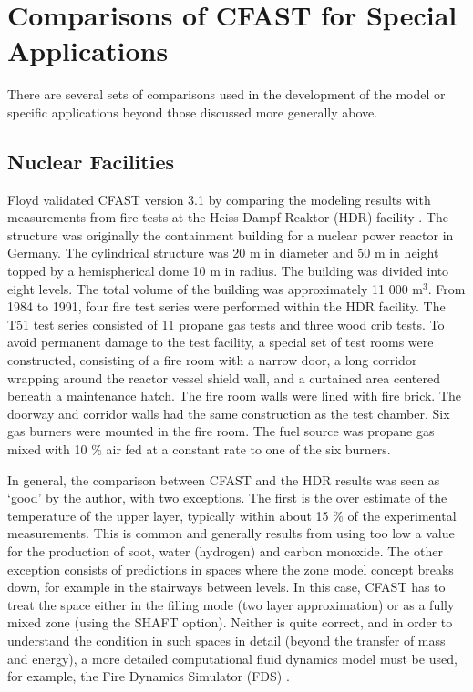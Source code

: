 \section{Comparisons of CFAST for Special Applications}

There are several sets of comparisons used in the development of the model or specific applications beyond those discussed more generally above.

\subsection{Nuclear Facilities}

Floyd validated CFAST version 3.1 by comparing the modeling results with measurements from fire tests at the Heiss-Dampf Reaktor (HDR) facility \cite{Floyd:2002}. The structure was originally the containment building for a nuclear power reactor in Germany. The cylindrical structure was 20 m in diameter and 50 m in height topped by a hemispherical dome 10 m in radius. The building was divided into eight levels. The total volume of the building was approximately 11 000 m$^3$. From 1984 to
1991, four fire test series were performed within the HDR facility. The T51 test series consisted of 11 propane gas tests and three wood crib tests. To avoid permanent damage to the test facility, a special set of test rooms were constructed, consisting of a fire room with a narrow door, a long corridor wrapping around the reactor vessel shield wall, and a curtained area centered beneath a maintenance hatch. The fire room walls were lined with fire brick. The doorway and corridor walls had the same construction as the test chamber. Six gas burners were mounted in the fire room. The fuel source was propane gas mixed with 10 \% air fed at a constant rate to one of the six burners.

In general, the comparison between CFAST and the HDR results was seen as `good' by the author, with two exceptions. The first is the over estimate of the temperature of the upper layer, typically within about 15 \% of the experimental measurements. This is common and generally results from using too low a value for the production of soot, water (hydrogen) and carbon monoxide. The other exception consists of predictions in spaces where the zone model concept breaks down, for example in the stairways between levels. In this case, CFAST has to treat the space either in the filling mode (two layer approximation) or as a fully mixed zone (using the SHAFT option). Neither is quite correct, and in order to understand the condition in such spaces in detail (beyond the transfer of mass and energy), a more detailed computational fluid dynamics model must be used, for example,  the Fire Dynamics Simulator (FDS) \cite{FDS_Tech_Guide_6}.

